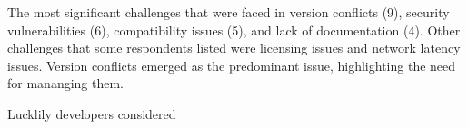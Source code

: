 \documentclass[sigconf]{acmart}
\begin{document}
The most significant challenges that were faced in version conflicts (9), security vulnerabilities (6), compatibility issues (5), and lack of documentation (4). Other challenges that some respondents listed were licensing issues and network latency issues. Version conflicts emerged as the predominant issue, highlighting the need for mananging them. 

Lucklily developers considered 



\end{document}

